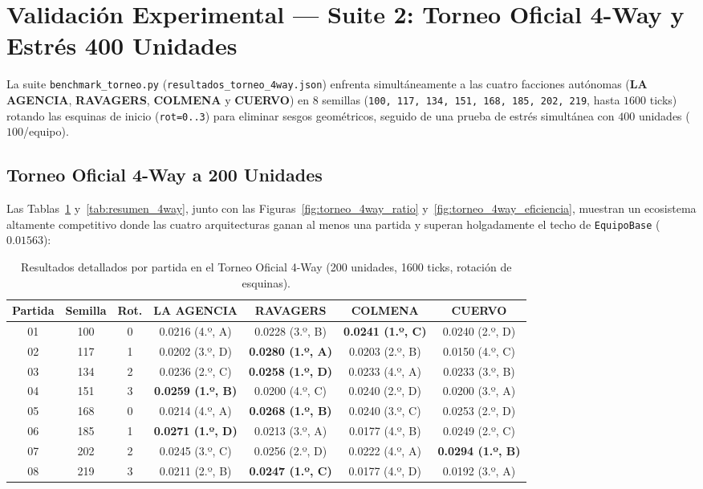 \documentclass[10pt,a4paper]{article}
\begin{document}
\section{Validación Experimental --- Suite 2: Torneo Oficial 4-Way y Estrés 400 Unidades}
La suite \texttt{benchmark\_torneo.py} (\texttt{resultados\_torneo\_4way.json}) enfrenta simultáneamente a las cuatro facciones autónomas (\textbf{LA AGENCIA}, \textbf{RAVAGERS}, \textbf{COLMENA} y \textbf{CUERVO}) en 8 semillas (\texttt{100, 117, 134, 151, 168, 185, 202, 219}, hasta $1600$ ticks) rotando las esquinas de inicio (\texttt{rot=0..3}) para eliminar sesgos geométricos, seguido de una prueba de estrés simultánea con $400$ unidades ($100$/equipo).

\subsection{Torneo Oficial 4-Way a 200 Unidades}
Las Tablas~\ref{tab:partidas_4way} y~\ref{tab:resumen_4way}, junto con las Figuras~\ref{fig:torneo_4way_ratio} y~\ref{fig:torneo_4way_eficiencia}, muestran un ecosistema altamente competitivo donde las cuatro arquitecturas ganan al menos una partida y superan holgadamente el techo de \texttt{EquipoBase} ($0.01563$):

\begin{table}[H]
\centering
\caption{Resultados detallados por partida en el Torneo Oficial 4-Way (200 unidades, 1600 ticks, rotación de esquinas).}\label{tab:partidas_4way}
\scriptsize
\begin{tabular}{ccccccc}
\toprule
\textbf{Partida} & \textbf{Semilla} & \textbf{Rot.} & \textbf{LA AGENCIA} & \textbf{RAVAGERS} & \textbf{COLMENA} & \textbf{CUERVO} \\
\midrule
01 & 100 & 0 & 0.0216 (4.º, A) & 0.0228 (3.º, B) & \textbf{0.0241 (1.º, C)} & 0.0240 (2.º, D) \\
02 & 117 & 1 & 0.0202 (3.º, D) & \textbf{0.0280 (1.º, A)} & 0.0203 (2.º, B) & 0.0150 (4.º, C) \\
03 & 134 & 2 & 0.0236 (2.º, C) & \textbf{0.0258 (1.º, D)} & 0.0233 (4.º, A) & 0.0233 (3.º, B) \\
04 & 151 & 3 & \textbf{0.0259 (1.º, B)} & 0.0200 (4.º, C) & 0.0240 (2.º, D) & 0.0200 (3.º, A) \\
05 & 168 & 0 & 0.0214 (4.º, A) & \textbf{0.0268 (1.º, B)} & 0.0240 (3.º, C) & 0.0253 (2.º, D) \\
06 & 185 & 1 & \textbf{0.0271 (1.º, D)} & 0.0213 (3.º, A) & 0.0177 (4.º, B) & 0.0249 (2.º, C) \\
07 & 202 & 2 & 0.0245 (3.º, C) & 0.0256 (2.º, D) & 0.0222 (4.º, A) & \textbf{0.0294 (1.º, B)} \\
08 & 219 & 3 & 0.0211 (2.º, B) & \textbf{0.0247 (1.º, C)} & 0.0177 (4.º, D) & 0.0192 (3.º, A) \\
\bottomrule
\end{tabular}
\end{table}
\end{document}
